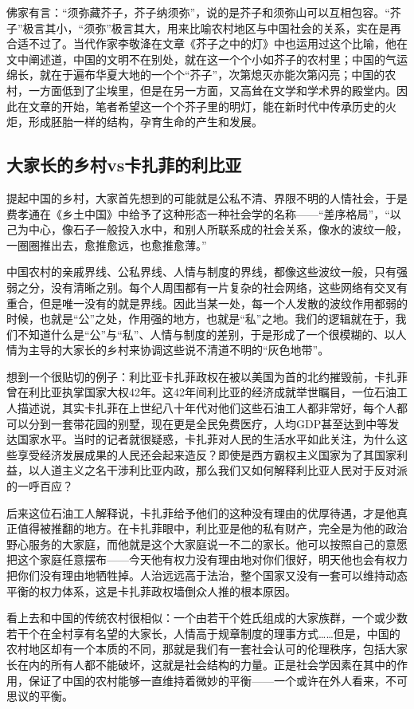 \documentclass[openany,scheme = chinese, linespread = 1.5]{ctexbook}
\begin{document}
佛家有言：“须弥藏芥子，芥子纳须弥”，说的是芥子和须弥山可以互相包容。“芥子”极言其小，“须弥”极言其大，用来比喻农村地区与中国社会的关系，实在是再合适不过了。当代作家李敬洚在文章《芥子之中的灯》中也运用过这个比喻，他在文中阐述道，中国的文明不在别处，就在这一个个小如芥子的农村里；中国的气运绵长，就在于遍布华夏大地的一个个“芥子”，次第熄灭亦能次第闪亮；中国的农村，一方面低到了尘埃里，但是在另一方面，又高耸在文学和学术界的殿堂内。因此在文章的开始，笔者希望这一个个芥子里的明灯，能在新时代中传承历史的火炬，形成胚胎一样的结构，孕育生命的产生和发展。

\subsection*{大家长的乡村vs卡扎菲的利比亚}

提起中国的乡村，大家首先想到的可能就是公私不清、界限不明的人情社会，于是费孝通在《乡土中国》中给予了这种形态一种社会学的名称——“差序格局”，“以己为中心，像石子一般投入水中，和别人所联系成的社会关系，像水的波纹一般，一圈圈推出去，愈推愈远，也愈推愈薄。”

中国农村的亲戚界线、公私界线、人情与制度的界线，都像这些波纹一般，只有强弱之分，没有清晰之别。每个人周围都有一片复杂的社会网络，这些网络有交叉有重合，但是唯一没有的就是界线。因此当某一处，每一个人发散的波纹作用都弱的时候，也就是“公”之处，作用强的地方，也就是“私”之地。我们的逻辑就在于，我们不知道什么是“公”与“私”、人情与制度的差别，于是形成了一个很模糊的、以人情为主导的大家长的乡村来协调这些说不清道不明的“灰色地带”。

想到一个很贴切的例子：利比亚卡扎菲政权在被以美国为首的北约摧毁前，卡扎菲曾在利比亚执掌国家大权42年。这42年间利比亚的经济成就举世瞩目，一位石油工人描述说，其实卡扎菲在上世纪八十年代对他们这些石油工人都非常好，每个人都可以分到一套带花园的别墅，现在更是全民免费医疗，人均GDP甚至达到中等发达国家水平。当时的记者就很疑惑，卡扎菲对人民的生活水平如此关注，为什么这些享受经济发展成果的人民还会起来造反？即使是西方霸权主义国家为了其国家利益，以人道主义之名干涉利比亚内政，那么我们又如何解释利比亚人民对于反对派的一呼百应？

后来这位石油工人解释说，卡扎菲给予他们的这种没有理由的优厚待遇，才是他真正值得被推翻的地方。在卡扎菲眼中，利比亚是他的私有财产，完全是为他的政治野心服务的大家庭，而他就是这个大家庭说一不二的家长。他可以按照自己的意愿把这个家庭任意摆布——今天他有权力没有理由地对你们很好，明天他也会有权力把你们没有理由地牺牲掉。人治远远高于法治，整个国家又没有一套可以维持动态平衡的权力体系，这是卡扎菲政权墙倒众人推的根本原因。

看上去和中国的传统农村很相似：一个由若干个姓氏组成的大家族群，一个或少数若干个在全村享有名望的大家长，人情高于规章制度的理事方式……但是，中国的农村地区却有一个本质的不同，那就是我们有一套社会认可的伦理秩序，包括大家长在内的所有人都不能破坏，这就是社会结构的力量。正是社会学因素在其中的作用，保证了中国的农村能够一直维持着微妙的平衡——一个或许在外人看来，不可思议的平衡。
\end{document}
